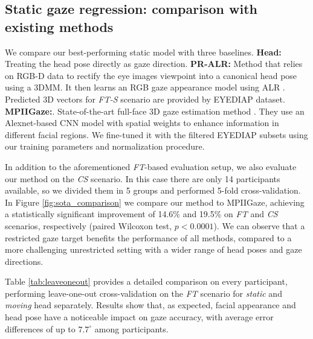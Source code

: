 \documentclass{bmvc2k}
\begin{document}
\subsection{Static gaze regression: comparison with existing methods}
\label{sec:comparison_sota}


We compare our best-performing static model with three baselines. \textbf{Head:} Treating the head pose directly as gaze direction. \textbf{PR-ALR:} Method that relies on RGB-D data to rectify the eye images viewpoint into a canonical head pose using a 3DMM. It then learns an RGB gaze appearance model using ALR \cite{mora2012gaze}. Predicted 3D vectors for \textit{FT-S} scenario are provided by EYEDIAP dataset. \textbf{MPIIGaze:}. State-of-the-art full-face 3D gaze estimation method \cite{zhang2015appearance}. They use an Alexnet-based CNN model with spatial weights to enhance information in different facial regions. We fine-tuned it with the filtered EYEDIAP subsets using our training parameters and normalization procedure. 

In addition to the aforementioned \textit{FT}-based evaluation setup, we also evaluate our method on the \textit{CS} scenario. In this case there are only 14 participants available, so we divided them in 5 groups and performed 5-fold cross-validation. In Figure \ref{fig:sota_comparison} we compare our method to MPIIGaze, achieving a statistically significant improvement of 14.6\% and 19.5\% on \textit{FT} and \textit{CS} scenarios, respectively (paired Wilcoxon test, $p < 0.0001$). We can observe that a restricted gaze target benefits the performance of all methods, compared to a more challenging unrestricted setting with a wider range of head poses and gaze directions.

Table \ref{tab:leaveoneout} provides a detailed comparison on every participant, performing leave-one-out cross-validation on the \textit{FT} scenario for \textit{static} and \textit{moving} head separately. Results show that, as expected, facial appearance and head pose have a noticeable impact on gaze accuracy, with average error differences of up to $7.7^\circ$ among participants.  
\end{document}
